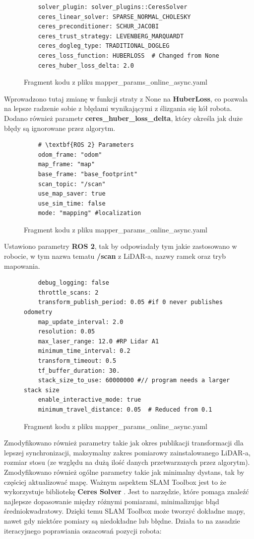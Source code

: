 \documentclass[a4paper,twoside,12pt]{book}
\begin{document}
\begin{itemize}
	\begin{figure}[!hb]
		\centering
	\begin{lstlisting}
    solver_plugin: solver_plugins::CeresSolver
    ceres_linear_solver: SPARSE_NORMAL_CHOLESKY
    ceres_preconditioner: SCHUR_JACOBI
    ceres_trust_strategy: LEVENBERG_MARQUARDT
    ceres_dogleg_type: TRADITIONAL_DOGLEG
    ceres_loss_function: HUBERLOSS  # Changed from None
    ceres_huber_loss_delta: 2.0  
\end{lstlisting}
\caption{Fragment kodu z pliku mapper\_params\_online\_async.yaml}
\label{fig:mapper-params1}
\end{figure}
Wprowadzono tutaj zmianę w funkcji straty z None na \textbf{HuberLoss}, co pozwala na lepsze radzenie sobie z błędami wynikającymi z ślizgania się kół robota. Dodano również parametr \textbf{ceres\_huber\_loss\_delta}, który określa jak duże błędy są ignorowane przez algorytm.
\newpage
\begin{figure}[!hb]
	\centering
\begin{lstlisting}
	# \textbf{ROS 2} Parameters
    odom_frame: "odom"
    map_frame: "map"
    base_frame: "base_footprint"
    scan_topic: "/scan"
    use_map_saver: true
    use_sim_time: false
    mode: "mapping" #localization
\end{lstlisting}
\caption{Fragment kodu z pliku mapper\_params\_online\_async.yaml}
\label{fig:mapper-params2}
\end{figure}
Ustawiono parametry \textbf{ROS 2}, tak by odpowiadały tym jakie zastosowano w robocie, w tym nazwa tematu \textbf{/scan} z LiDAR-a, nazwy ramek oraz tryb mapowania.
\begin{figure}[!hb]
	\centering
\begin{lstlisting}
	debug_logging: false
    throttle_scans: 2
    transform_publish_period: 0.05 #if 0 never publishes odometry
    map_update_interval: 2.0
    resolution: 0.05
    max_laser_range: 12.0 #RP Lidar A1
    minimum_time_interval: 0.2
    transform_timeout: 0.5
    tf_buffer_duration: 30.
    stack_size_to_use: 60000000 #// program needs a larger stack size
    enable_interactive_mode: true
	minimum_travel_distance: 0.05  # Reduced from 0.1
\end{lstlisting}
\caption{Fragment kodu z pliku mapper\_params\_online\_async.yaml}
\label{fig:mapper-params3}
\end{figure}
\newline Zmodyfikowano również parametry takie jak okres publikacji transformacji dla lepszej synchronizacji, maksymalny zakres pomiarowy zainstalowanego LiDAR-a, rozmiar stosu (ze względu na dużą ilość danych przetwarzanych przez algorytm). Zmodyfikowano również ogólne parametry takie jak minimalny dystans, tak by częściej aktualizować mapę.
\newpage
Ważnym aspektem SLAM Toolbox jest to że wykorzystuje bibliotekę \textbf{Ceres Solver} \cite{bib:Agarwal_Ceres_Solver_2022}. Jest to narzędzie, które pomaga znaleźć najlepsze dopasowanie między różnymi pomiarami, minimalizując błąd średniokwadratowy. Dzięki temu SLAM Toolbox może tworzyć dokładne mapy, nawet gdy niektóre pomiary są niedokładne lub błędne. 
\newline
Działa to na zasadzie iteracyjnego poprawiania oszacowań pozycji robota:


\end{itemize}
\end{document}
